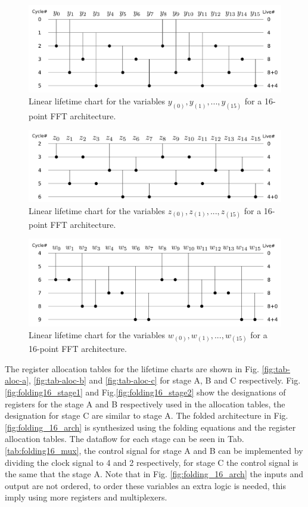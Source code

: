 \documentclass[10pt,times,mathptm,psfig,final,journal,comsoc]{IEEEtran}
\begin{document}
\begin{figure}[t!]
\centering
 \includegraphics[width=\linewidth]{Diagramas/life_chart_a.png}
\caption{Linear lifetime chart for the variables $y_{(0)}, y_{(1)},...,y_{(15)}$ for a 16-point FFT architecture.}
\label{fig:tab-life-a}
\end{figure}
\begin{figure}[t!]
\centering
 \includegraphics[width=\linewidth]{Diagramas/life_chart_b.png}
\caption{Linear lifetime chart for the variables $z_{(0)}, z_{(1)},...,z_{(15)}$ for a 16-point FFT architecture.}
\label{fig:tab-life-b}
\end{figure}
\begin{figure}[t!]
\centering
 \includegraphics[width=\linewidth]{Diagramas/life_chart_c.png}
\caption{Linear lifetime chart for the variables $w_{(0)}, w_{(1)},...,w_{(15)}$ for a 16-point FFT architecture.}
\label{fig:tab-life-c}
\end{figure}

The register allocation tables for the lifetime charts are shown in Fig. \ref{fig:tab-aloc-a}, \ref{fig:tab-aloc-b} and \ref{fig:tab-aloc-c} for stage A, B and C respectively. Fig.\ref{fig:folding16_stage1} and  Fig.\ref{fig:folding16_stage2} show the designations of registers for the stage A and B respectively used in the allocation tables, the designation for stage C are similar to stage A. The folded architecture in Fig.\ref{fig:folding_16_arch} is synthesized using the folding equations and the register allocation tables. The dataflow for each stage can be seen in Tab. \ref{tab:folding16_mux}, the control signal for stage A and B can be implemented by dividing the clock signal to 4 and 2 respectively, for stage C the control signal is the same that the stage A. 
Note that in Fig. \ref{fig:folding_16_arch} the inputs and output are not ordered, to order these variables an extra logic is needed, this imply using more registers and multiplexers.
\end{document}
